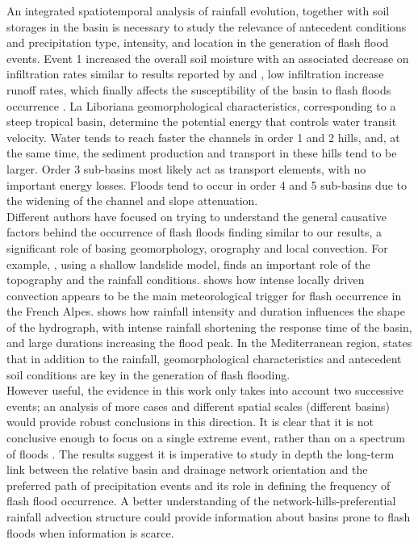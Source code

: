 \documentclass[hess, manuscript]{copernicus} %
\providecommand{\DIFadd}[1]{{\protect\color{blue}\uwave{#1}}} %
\providecommand{\DIFaddbegin}{} %
\providecommand{\DIFaddend}{} %
\begin{document}
An integrated spatiotemporal analysis of rainfall evolution, together with soil storages in the basin is necessary to study the relevance of antecedent conditions and precipitation type, intensity, and location in the generation of flash flood events.  Event 1 increased the overall soil moisture with an associated decrease on infiltration rates similar to results reported by \citet{Penna2011} and \citet{Zehe2010}, low infiltration increase runoff rates, which finally affects the susceptibility of the basin to  flash floods occurrence \citep{Wagner1999,Penna2011,Tramblay2012b}. La Liboriana geomorphological characteristics, corresponding to a steep tropical basin, determine the potential energy that controls water transit velocity.  Water tends to reach faster the channels in order 1 and 2 hills, and, at the same time, the sediment production and transport in these hills tend to be larger.  Order 3 sub-basins most likely act as transport elements, with no important energy losses. Floods tend to occur in order 4 and 5 sub-basins due to the widening of the channel and slope attenuation. \\

Different authors have focused on trying to understand the general causative factors behind the occurrence of flash floods finding similar to our results, a significant role of basing geomorphology, orography and local convection. For example, \citet{Lehmann2012}, using a shallow landslide model, finds an important role of the topography and the rainfall conditions.  \citet{Turkington2014} shows how intense locally driven convection appears to be the main meteorological trigger for flash occurrence in the French Alpes.\citet{Camarasa2016} shows how rainfall intensity and duration influences the shape of the hydrograph, with intense rainfall shortening the response time of the basin, and large durations increasing the flood peak. In the Mediterranean region, \citet{Boudou2016}  states that in addition to the rainfall, geomorphological characteristics and antecedent soil conditions are key in the generation of flash flooding.\\

However useful, the evidence in this work only takes into account two successive events; an analysis of more cases and different spatial scales (different basins) would provide robust conclusions in this direction. It is clear that it is not conclusive enough to focus on a single extreme event, rather than on a spectrum of floods \cite{Merz2003}.  The \DIFaddbegin \DIFadd{model simulation }\DIFaddend results suggest it is imperative to study in depth the long-term link between the relative basin and drainage network orientation and the preferred path of precipitation events and its role in defining the frequency of flash flood occurrence. A better understanding of the network-hills-preferential rainfall advection structure could provide information about basins prone to flash floods when information is scarce.\\
\end{document}
